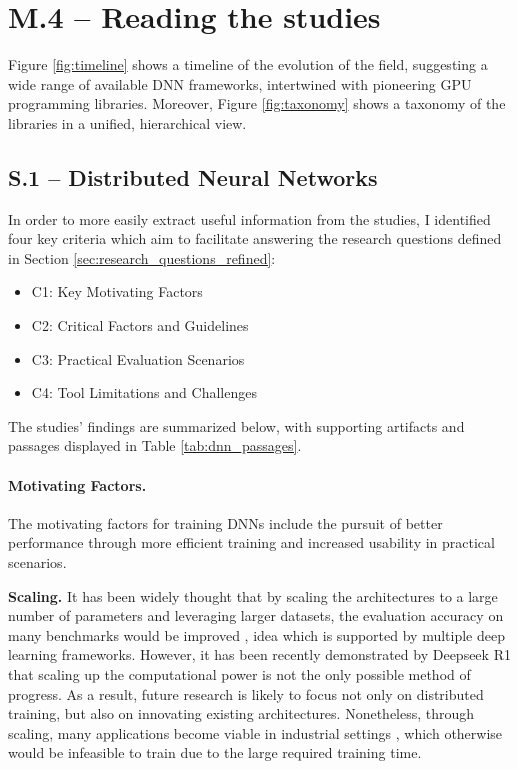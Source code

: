 \section{M.4 -- Reading the studies}
\label{sec:reading-studies}
Figure \ref{fig:timeline} shows a timeline of the evolution of the field, suggesting a wide range
of available DNN frameworks, intertwined with pioneering GPU programming libraries.
Moreover, Figure \ref{fig:taxonomy} shows a taxonomy of the libraries in a unified, hierarchical
view.

\subsection{S.1 -- Distributed Neural Networks}
\label{sec:dnn-studies}

In order to more easily extract useful information from the studies, I identified four key criteria
which aim to facilitate answering the research questions defined in Section
\ref{sec:research_questions_refined}:

\begin{itemize}
	\item C1: Key Motivating Factors
	\item C2: Critical Factors and Guidelines
	\item C3: Practical Evaluation Scenarios
	\item C4: Tool Limitations and Challenges
\end{itemize}

The studies' findings are summarized below, with supporting artifacts and passages displayed in
Table \ref{tab:dnn_passages}.

\paragraph{Motivating Factors.}
The motivating factors for training DNNs include the pursuit of better performance through more
efficient training and increased usability in practical scenarios.

\textbf{Scaling.}
It has been widely thought that
by scaling the architectures to a large number of parameters and leveraging larger datasets, the
evaluation accuracy on many benchmarks would be improved , idea which
is supported by multiple deep learning frameworks. However, it has been recently demonstrated by
Deepseek R1 \cite{deepseekai2025deepseekr1incentivizingreasoningcapability} that scaling up the
computational power is not the only possible method of progress. As a result, future research is
likely to focus not only on distributed training, but also on innovating existing architectures.
Nonetheless, through scaling, many applications become viable in industrial settings
, which otherwise would be infeasible to train due to the large required
training time.

